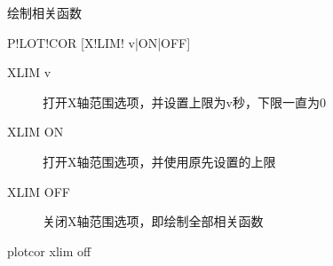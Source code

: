 \label{spe:plotcor}

绘制相关函数

\begin{SACSTX}
P!LOT!COR [X!LIM! v|ON|OFF]
\end{SACSTX}

\begin{description}
\item [XLIM v] 打开X轴范围选项，并设置上限为v秒，下限一直为0
\item [XLIM ON] 打开X轴范围选项，并使用原先设置的上限
\item [XLIM OFF] 关闭X轴范围选项，即绘制全部相关函数
\end{description}

\begin{SACDFT}
plotcor xlim off
\end{SACDFT}
